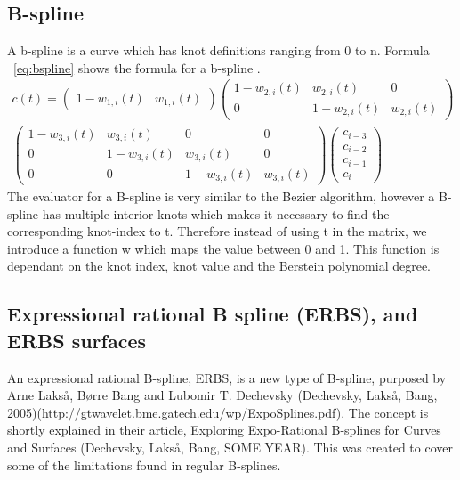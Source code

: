\documentclass[a4paper,11pt]{article}
\begin{document}
\subsection{B-spline}
A b-spline is a curve which has knot definitions ranging from 0 to n. Formula ~\ref{eq:bspline} shows the formula for a b-spline \cite{book_bperbs}. 
\begin{multline} \label{eq:bspline}
c(t)=\begin{pmatrix}
1-w_{1,i}(t) & w_{1,i}(t)
\end{pmatrix}
\begin{pmatrix}
1-w_{2,i}(t) & w_{2,i}(t) & 0 \\ 
0 & 1-w_{2,i}(t) & w_{2,i}(t) 
\end{pmatrix}
\\
\begin{pmatrix}
1-w_{3,i}(t) & w_{3,i}(t) & 0 & 0\\ 
0 &  1-w_{3,i}(t) & w_{3,i}(t)  & 0 \\ 
0 & 0 &  1-w_{3,i}(t) & w_{3,i}(t) 
\end{pmatrix}
\begin{pmatrix}
c_{i-3}\\ 
c_{i-2}\\ 
c_{i-1}\\ 
c_{i}
\end{pmatrix}
\end{multline}
The evaluator for a B-spline is very similar to the Bezier algorithm, however a B-spline has multiple interior knots which makes it necessary to find the corresponding knot-index to t. Therefore instead of using t in the matrix, we introduce a function w which maps the value between 0 and 1. This function is dependant on the knot index, knot value and the Berstein polynomial degree. 


\subsection{Expressional rational B spline (ERBS), and ERBS surfaces}
An expressional rational B-spline, ERBS, is a new type of B-spline, purposed by Arne Lakså, Børre Bang and Lubomir T. Dechevsky (Dechevsky, Lakså, Bang, 2005)(http://gtwavelet.bme.gatech.edu/wp/ExpoSplines.pdf). The concept is shortly explained in their article, Exploring Expo-Rational B-splines for Curves and Surfaces (Dechevsky, Lakså, Bang, SOME YEAR). This was created to cover some of the limitations found in regular B-splines.\\
\end{document}
